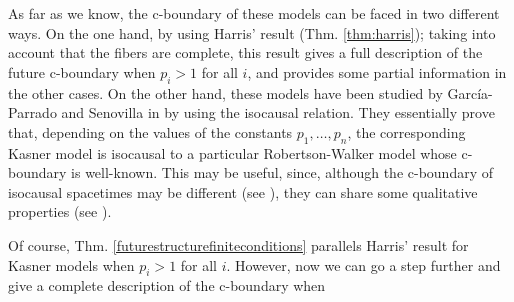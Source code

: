 As far as we know, the c-boundary of these models can be faced in two different ways. On the one hand, by using Harris' result (Thm. \ref{thm:harris}); taking into account that the fibers are complete, this result gives a full description of the future c-boundary when $p_i>1$ for all $i$, and provides some partial information in the other cases. On the other hand, these models have been studied
 by Garc\'ia-Parrado and Senovilla in \cite{GS03} by using the isocausal relation. They essentially prove that, depending on the values of the constants $p_1,\ldots,p_n$, the corresponding Kasner model is isocausal to a particular Robertson-Walker model whose c-boundary is well-known. This may be useful, since, although the c-boundary of isocausal spacetimes may be different (see \cite{0264-9381-28-17-175016}), they can share some qualitative properties (see \cite{FHSIso2}).

 \smallskip


Of course, Thm. \ref{futurestructurefiniteconditions} parallels Harris' result for Kasner models when $p_i>1$ for all $i$. However, now we can go a step further and give a complete description of the c-boundary when








